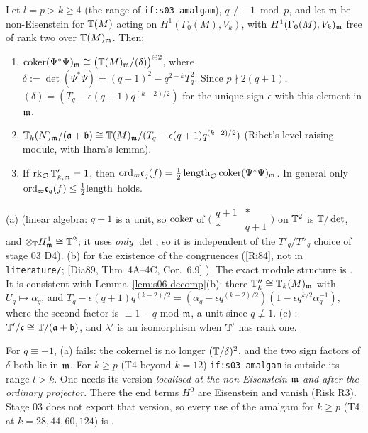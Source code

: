 \begin{proposition}\label{prop:s06-betti}
Let $l=p>k\ge4$ (the range of \texttt{if:s03-amalgam}), $q\not\equiv-1\bmod p$, and let $\mathfrak{m}$ be non-Eisenstein for $\mathbb{T}(M)$ acting on
$H^1(\Gamma_0(M),V_k)$, with $H^1(\Gamma_0(M),V_k)_{\mathfrak{m}}$ free of rank two over $\mathbb{T}(M)_{\mathfrak{m}}$. Then:
\begin{enumerate}[label=(\alph*)]
\item $\operatorname{coker}(\Psi^*\Psi)_{\mathfrak{m}}\cong\big(\mathbb{T}(M)_{\mathfrak{m}}/(\delta)\big)^{\oplus2}$, where $\delta:=\det(\Psi^*\Psi)=(q+1)^2-q^{2-k}T_q^2$.
  Since $p\nmid2(q+1)$, $(\delta)=(T_q-\epsilon(q+1)q^{(k-2)/2})$ for the unique sign $\epsilon$ with this element in $\mathfrak{m}$.
\item $\mathbb{T}_k(N)_{\mathfrak{m}}/(\mathfrak{a}+\mathfrak{b})\cong\mathbb{T}(M)_{\mathfrak{m}}/(T_q-\epsilon(q+1)q^{(k-2)/2})$ (Ribet's level-raising module, with Ihara's lemma).
\item If $\operatorname{rk}_{\mathcal{O}}\mathbb{T}'_{k,\mathfrak{m}}=1$, then $\mathrm{ord}_\varpi\mathfrak{c}_q(f)=\tfrac12\,\mathrm{length}_{\mathcal{O}}\operatorname{coker}(\Psi^*\Psi)_{\mathfrak{m}}$. In general only
  $\mathrm{ord}_\varpi\mathfrak{c}_q(f)\le\tfrac12\mathrm{length}$ holds.
\end{enumerate}
(a) \sttoprove{} (linear algebra: $q+1$ is a unit, so $\operatorname{coker}$ of $\big(\begin{smallmatrix}q+1&*\\ *&q+1\end{smallmatrix}\big)$ on
$\mathbb{T}^2$ is $\mathbb{T}/\det$, and $\otimes_{\mathbb{T}} H^1_{\mathfrak{m}}\cong\mathbb{T}^2$; it uses \emph{only} $\det$, so it is independent of the $T'_q/T''_q$ choice of
stage 03 D4). (b) \stcited{} for the existence of the congruences ([Ri84], not in \texttt{literature/}; [Dia89, Thm~4A--4C, Cor.~6.9]
). The exact module structure is
\sttoprove. It is consistent with Lemma~\ref{lem:s06-decomp}(b): there $\mathbb{T}''_k\cong\mathbb{T}_k(M)_{\mathfrak{m}}$ with $U_q\mapsto\alpha_q$, and
$T_q-\epsilon(q+1)q^{(k-2)/2}=(\alpha_q-\epsilon q^{(k-2)/2})(1-\epsilon q^{k/2}\alpha_q^{-1})$, where the second factor is
$\equiv1-q$ mod $\mathfrak{m}$, a unit since $q\not\equiv1$.  (c) \stpmc: $\mathbb{T}'/\mathfrak{c}\cong\mathbb{T}/(\mathfrak{a}+\mathfrak{b})$, and $\lambda'$ is an isomorphism when $\mathbb{T}'$ has rank one.
\end{proposition}
\noindent For $q\equiv-1$, (a) fails: the cokernel is no longer $(\mathbb{T}/\delta)^2$, and the two sign factors of $\delta$ both lie in
$\mathfrak{m}$. For $k\ge p$ (T4 beyond $k=12$) \texttt{if:s03-amalgam} is outside its range $l>k$. One needs its version \emph{localised at the
non-Eisenstein $\mathfrak{m}$ and after the ordinary projector}. There the end terms $H^0$ are Eisenstein and vanish (Risk R3). Stage 03 does not
export that version, so every use of the amalgam for $k\ge p$ (T4 at $k=28,44,60,124$) is \stexp.

